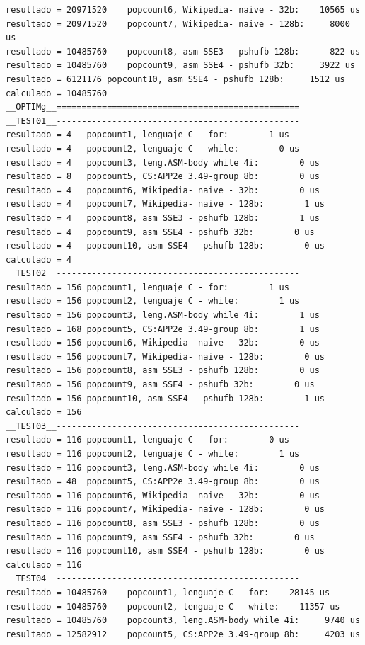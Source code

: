 \begin{lstlisting}[frame=single]
resultado = 20971520	popcount6, Wikipedia- naive - 32b:    10565 us
resultado = 20971520	popcount7, Wikipedia- naive - 128b:     8000 us
resultado = 10485760	popcount8, asm SSE3 - pshufb 128b:      822 us
resultado = 10485760	popcount9, asm SSE4 - pshufb 32b:     3922 us
resultado = 6121176	popcount10, asm SSE4 - pshufb 128b:     1512 us
calculado = 10485760
__OPTIMg__================================================
__TEST01__------------------------------------------------
resultado = 4	popcount1, lenguaje C - for:        1 us
resultado = 4	popcount2, lenguaje C - while:        0 us
resultado = 4	popcount3, leng.ASM-body while 4i:        0 us
resultado = 8	popcount5, CS:APP2e 3.49-group 8b:        0 us
resultado = 4	popcount6, Wikipedia- naive - 32b:        0 us
resultado = 4	popcount7, Wikipedia- naive - 128b:        1 us
resultado = 4	popcount8, asm SSE3 - pshufb 128b:        1 us
resultado = 4	popcount9, asm SSE4 - pshufb 32b:        0 us
resultado = 4	popcount10, asm SSE4 - pshufb 128b:        0 us
calculado = 4
__TEST02__------------------------------------------------
resultado = 156	popcount1, lenguaje C - for:        1 us
resultado = 156	popcount2, lenguaje C - while:        1 us
resultado = 156	popcount3, leng.ASM-body while 4i:        1 us
resultado = 168	popcount5, CS:APP2e 3.49-group 8b:        1 us
resultado = 156	popcount6, Wikipedia- naive - 32b:        0 us
resultado = 156	popcount7, Wikipedia- naive - 128b:        0 us
resultado = 156	popcount8, asm SSE3 - pshufb 128b:        0 us
resultado = 156	popcount9, asm SSE4 - pshufb 32b:        0 us
resultado = 156	popcount10, asm SSE4 - pshufb 128b:        1 us
calculado = 156
__TEST03__------------------------------------------------
resultado = 116	popcount1, lenguaje C - for:        0 us
resultado = 116	popcount2, lenguaje C - while:        1 us
resultado = 116	popcount3, leng.ASM-body while 4i:        0 us
resultado = 48	popcount5, CS:APP2e 3.49-group 8b:        0 us
resultado = 116	popcount6, Wikipedia- naive - 32b:        0 us
resultado = 116	popcount7, Wikipedia- naive - 128b:        0 us
resultado = 116	popcount8, asm SSE3 - pshufb 128b:        0 us
resultado = 116	popcount9, asm SSE4 - pshufb 32b:        0 us
resultado = 116	popcount10, asm SSE4 - pshufb 128b:        0 us
calculado = 116
__TEST04__------------------------------------------------
resultado = 10485760	popcount1, lenguaje C - for:    28145 us
resultado = 10485760	popcount2, lenguaje C - while:    11357 us
resultado = 10485760	popcount3, leng.ASM-body while 4i:     9740 us
resultado = 12582912	popcount5, CS:APP2e 3.49-group 8b:     4203 us

\end{lstlisting}
